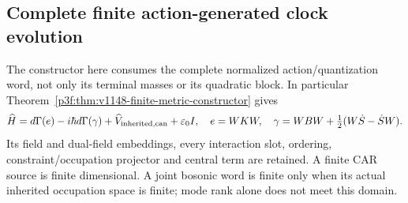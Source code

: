 \documentclass[12pt,a4paper]{article}
\begin{document}


\subsection{Complete finite action-generated clock evolution}
\label{p4:sec:v2190-finite-action-evolution}

The constructor here consumes the complete normalized action/quantization
word, not only its terminal masses or its quadratic block.  In particular
Theorem~\ref{p3f:thm:v1148-finite-metric-constructor} gives
\[
 \widehat H=d\Gamma(e)-i\hbar d\Gamma(\gamma)
            +\widehat V_{\rm inherited,can}+\varepsilon_0I,
 \quad e=WKW,\quad
 \gamma=WBW+\tfrac12(W\dot S-\dot SW).
\]
Its field and dual-field embeddings, every interaction slot, ordering,
constraint/occupation projector and central term are retained.  A finite
CAR source is finite dimensional.  A joint bosonic word is finite only
when its actual inherited occupation space is finite; mode rank alone
does not meet this domain.
\end{document}
